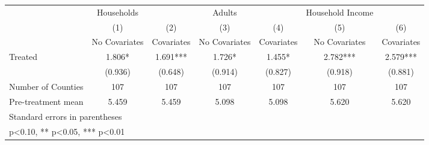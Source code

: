 {
\def\sym#1{\ifmmode^{#1}\else\(^{#1}\)\fi}
\begin{tabular}{l*{6}{c}}
\hline\hline
            &  Households   &               &      Adults   &               &Household Income   &               \\
            &\multicolumn{1}{c}{(1)}&\multicolumn{1}{c}{(2)}&\multicolumn{1}{c}{(3)}&\multicolumn{1}{c}{(4)}&\multicolumn{1}{c}{(5)}&\multicolumn{1}{c}{(6)}\\
            &\multicolumn{1}{c}{No Covariates}&\multicolumn{1}{c}{Covariates}&\multicolumn{1}{c}{No Covariates}&\multicolumn{1}{c}{Covariates}&\multicolumn{1}{c}{No Covariates}&\multicolumn{1}{c}{Covariates}\\
\hline
Treated     &       1.806*  &       1.691***&       1.726*  &       1.455*  &       2.782***&       2.579***\\
            &     (0.936)   &     (0.648)   &     (0.914)   &     (0.827)   &     (0.918)   &     (0.881)   \\
\hline
Number of Counties&         107   &         107   &         107   &         107   &         107   &         107   \\
Pre-treatment mean&       5.459   &       5.459   &       5.098   &       5.098   &       5.620   &       5.620   \\
\hline\hline
\multicolumn{7}{l}{\footnotesize Standard errors in parentheses}\\
\multicolumn{7}{l}{\footnotesize * p<0.10, ** p<0.05, *** p<0.01}\\
\end{tabular}
}
